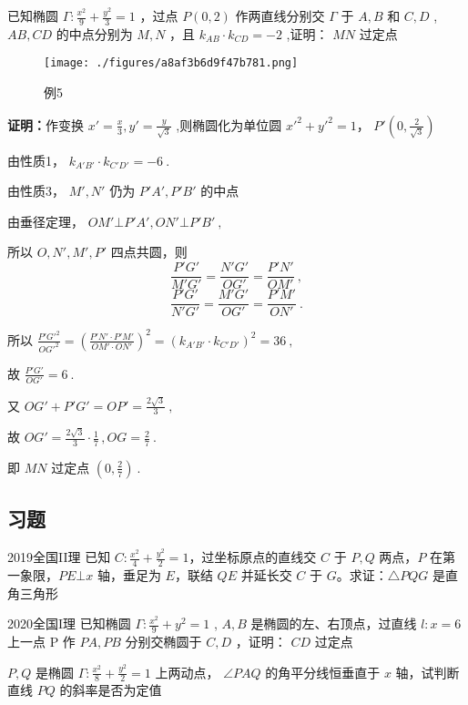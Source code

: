 \begin{example}{}
 已知椭圆 $\displaystyle{\Gamma:\frac{x^2}{9}+\frac{y^2}{3}=1}$ ，过点 $\displaystyle{P(0,2)}$ 作两直线分别交 $\displaystyle{\Gamma}$ 于 $\displaystyle{A,B}$ 和 $\displaystyle{C,D}$ , $\displaystyle{AB,CD}$ 的中点分别为 $\displaystyle{M,N}$ ，且 $\displaystyle{k_{AB}\cdot k_{CD}=-2}$ ,证明： $\displaystyle{MN}$ 过定点
\begin{figure}[ht]
\centering
\texttt{[image: ./figures/a8af3b6d9f47b781.png]}
\caption{例5} \label{fig_affine_12}
\end{figure}
\textbf{证明：}作变换 $\displaystyle{x'=\frac{x}{3},y'=\frac{y}{\sqrt{3}}}$ ,则椭圆化为单位圆 $\displaystyle{x'^2+y'^2=1}$， $\displaystyle{P'\left(0,\frac{2}{\sqrt{3}}\right)}$

由性质1， $\displaystyle{k_{A'B'}\cdot k_{C'D'}=-6}~.$

由性质3， $\displaystyle{M',N'}$ 仍为 $\displaystyle{P'A',P'B'}$ 的中点

由垂径定理， $\displaystyle{OM'\bot P'A',ON'\bot P'B'}~,$

所以 $\displaystyle{O,N',M',P'}$ 四点共圆，则 
$$\frac{P'G'}{M'G'}=\frac{N'G'}{OG'}=\frac{P'N'}{OM'}~,$$
$$\frac{P'G'}{N'G'}=\frac{M'G'}{OG'}=\frac{P'M'}{ON'}~.$$

所以 $\displaystyle{\frac{P'G'^2}{OG'^2}=\left(\frac{P'N'\cdot P'M'}{OM'\cdot ON'}\right)^2=\left(k_{A'B'}\cdot k_{C'D'}\right)^2=36}~,$ 

故 $\displaystyle{\frac{P'G'}{OG'}=6}~.$ 

又 $\displaystyle{OG'+P'G'=OP'=\frac{2\sqrt{3}}{3}}~,$ 

故 $\displaystyle{OG'=\frac{2\sqrt{3}}{3}\cdot\frac{1}{7}\,,OG=\frac{2}{7}}~.$ 

即 $\displaystyle{MN}$ 过定点 $\displaystyle{\left(0,\frac{2}{7}\right)}~.$ 
\end{example}
\subsection{习题}
\begin{exercise}{2019全国II理}
已知 $\displaystyle{C:\frac{x^2}4+\frac{y^2}2=1}$，过坐标原点的直线交 $\displaystyle{C}$ 于 $\displaystyle{P,Q}$ 两点，$\displaystyle{P}$ 在第一象限，$\displaystyle{PE\bot x}$ 轴，垂足为 $\displaystyle{E}$，联结 $\displaystyle{QE}$ 并延长交 $\displaystyle{C}$ 于 $\displaystyle{G}$。求证：$\displaystyle{\triangle PQG}$ 是直角三角形
\end{exercise}
\begin{exercise}{2020全国I理}
已知椭圆 $\displaystyle{\Gamma:\frac{x^2}{9}+y^2=1}$ , $\displaystyle{A,B}$ 是椭圆的左、右顶点，过直线 $\displaystyle{l:x=6}$ 上一点 P 作 $\displaystyle{PA,PB}$ 分别交椭圆于 $\displaystyle{C,D}$ ，证明： $\displaystyle{CD}$ 过定点
\end{exercise}

\begin{exercise}{}
 $\displaystyle{P,Q}$ 是椭圆 $\displaystyle{\Gamma:\frac{x^2}{8}+\frac{y^2}{2}=1}$ 上两动点， $\displaystyle{\angle PAQ}$ 的角平分线恒垂直于 $\displaystyle{x}$ 轴，试判断直线 $\displaystyle{PQ}$ 的斜率是否为定值
\end{exercise}
